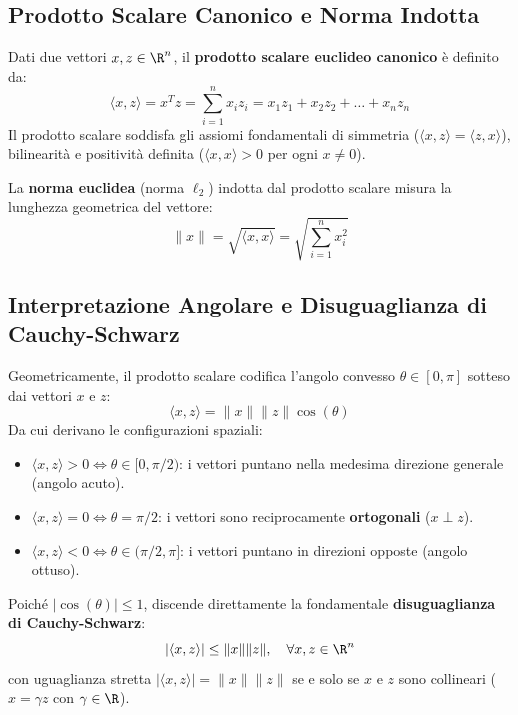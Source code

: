 \subsection{Prodotto Scalare Canonico e Norma Indotta}
Dati due vettori $x, z \in \R^n$, il \textbf{prodotto scalare euclideo canonico} \`e definito da:
\begin{equation}
\langle x, z \rangle = x^T z = \sum_{i=1}^n x_i z_i = x_1 z_1 + x_2 z_2 + \dots + x_n z_n
\end{equation}
Il prodotto scalare soddisfa gli assiomi fondamentali di simmetria ($\langle x, z \rangle = \langle z, x \rangle$), bilinearit\`a e positivit\`a definita ($\langle x, x \rangle > 0$ per ogni $x \neq 0$).

La \textbf{norma euclidea} (norma $\ell_2$) indotta dal prodotto scalare misura la lunghezza geometrica del vettore:
\begin{equation}
\|x\| = \sqrt{\langle x, x \rangle} = \sqrt{\sum_{i=1}^n x_i^2}
\end{equation}

\subsection{Interpretazione Angolare e Disuguaglianza di Cauchy-Schwarz}
Geometricamente, il prodotto scalare codifica l'angolo convesso $\theta \in [0, \pi]$ sotteso dai vettori $x$ e $z$:
\begin{equation}
\langle x, z \rangle = \|x\| \|z\| \cos(\theta)
\end{equation}
Da cui derivano le configurazioni spaziali:
\begin{itemize}
    \item $\langle x, z \rangle > 0 \iff \theta \in [0, \pi/2)$: i vettori puntano nella medesima direzione generale (angolo acuto).
    \item $\langle x, z \rangle = 0 \iff \theta = \pi/2$: i vettori sono reciprocamente \textbf{ortogonali} ($x \perp z$).
    \item $\langle x, z \rangle < 0 \iff \theta \in (\pi/2, \pi]$: i vettori puntano in direzioni opposte (angolo ottuso).
\end{itemize}

Poich\'e $|\cos(\theta)| \le 1$, discende direttamente la fondamentale \textbf{disuguaglianza di Cauchy-Schwarz}:
\begin{equation}
|\langle x, z \rangle| \le \|x\| \|z\|, \quad \forall x, z \in \R^n
\end{equation}
con uguaglianza stretta $|\langle x, z \rangle| = \|x\| \|z\|$ se e solo se $x$ e $z$ sono collineari ($x = \gamma z$ con $\gamma \in \R$).

